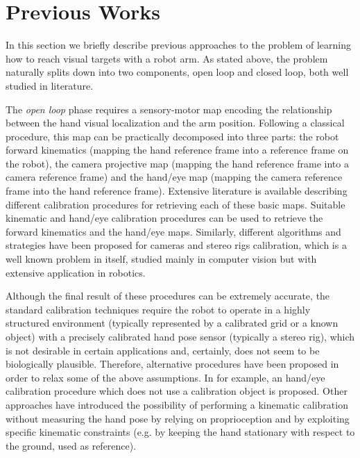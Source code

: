 \section{Previous Works}



In this section we briefly describe previous approaches to the problem of 
learning how to reach visual targets with a robot arm. As stated above, the problem 
naturally splits down into two components, open loop and closed loop, both well 
studied in literature.

The {\em open loop} phase requires a sensory-motor map encoding the relationship between the hand visual localization and the arm position. Following a classical procedure, this map can be practically decomposed into three parts: the robot forward kinematics (mapping the hand reference frame into a reference frame on the robot), the camera projective map (mapping the hand reference frame into a camera reference frame) and the hand/eye map (mapping the camera reference frame into the hand reference frame). Extensive literature is available describing different calibration procedures for retrieving each of these basic maps. Suitable kinematic \cite{Hollerbach96calibration} and hand/eye \cite{Tsai88calibration} calibration procedures can be used to retrieve the forward kinematics and the hand/eye maps. Similarly, different algorithms and strategies have been proposed for cameras and stereo rigs calibration, which is a well known problem in itself, studied mainly in computer vision \cite{Soatto03vision} but with extensive application in robotics. 

Although the final result of these procedures can be extremely accurate, the standard calibration techniques require the robot to operate in a highly structured environment (typically represented by a calibrated grid or a known object) with a precisely calibrated hand pose sensor (typically a stereo rig), which is not desirable in certain applications and, certainly, does not seem to be biologically plausible. Therefore, alternative procedures have been proposed in order to relax some of the above assumptions. In \cite{AHE01} for example, an hand/eye calibration procedure which does not use a calibration object is proposed. Other approaches have introduced the possibility of performing a kinematic calibration without measuring the hand pose \cite{Bennett91calibration} by relying on proprioception and by exploiting specific kinematic constraints (e.g. by keeping the hand stationary with respect to the ground, used as reference).

